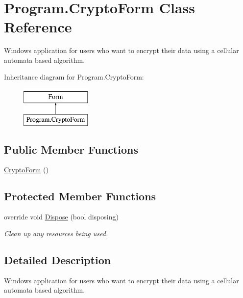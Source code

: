 \hypertarget{class_program_1_1_crypto_form}{}\section{Program.\+Crypto\+Form Class Reference}
\label{class_program_1_1_crypto_form}


Windows application for users who want to encrypt their data using a cellular automata based algorithm.  


Inheritance diagram for Program.\+Crypto\+Form\+:\begin{figure}[H]
\begin{center}
\leavevmode
\includegraphics[height=2.000000cm]{class_program_1_1_crypto_form}
\end{center}
\end{figure}
\subsection*{Public Member Functions}
\begin{DoxyCompactItemize}
\item 
\hyperlink{class_program_1_1_crypto_form_ab4de171d2fe2499055864e45f9efa4cc}{Crypto\+Form} ()
\end{DoxyCompactItemize}
\subsection*{Protected Member Functions}
\begin{DoxyCompactItemize}
\item 
override void \hyperlink{class_program_1_1_crypto_form_adaa80d92f4324b9d835d8125dcda4582}{Dispose} (bool disposing)
\begin{DoxyCompactList}\small\item\em Clean up any resources being used. \end{DoxyCompactList}\end{DoxyCompactItemize}


\subsection{Detailed Description}
Windows application for users who want to encrypt their data using a cellular automata based algorithm. 



